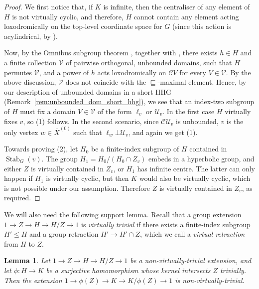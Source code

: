 \documentclass[svgnames]{amsart}
\theoremstyle{plain}
\newtheorem{lemma}[thm]{Lemma}
\theoremstyle{definition}
\newcommand{\C}{\mathcal C}
\newcommand{\ov}[1]{\overline{#1}}
\newcommand{\U}{\mathcal{U}}
\newcommand{\nest}{\sqsubseteq}
\newcommand{\orth}{\bot}
\newcommand{\Stab}[2]{\operatorname{Stab}_{#1}(#2)}
\begin{document}
\begin{proof}
    We first notice that, if $K$ is infinite, then the centraliser of any element of $H$ is not virtually cyclic, and therefore, $H$ cannot contain any element acting loxodromically on the top-level coordinate space for $G$ (since this action is acylindrical, by \cite[Corollary 14.4]{HHS_I}). 

    Now, by the Omnibus subgroup theorem \cite[Theorem 9.20]{DHS}, together with \cite[Theorem 7.1]{DHS}, there exists $h\in H$ and a finite collection $\mathcal V$ of pairwise orthogonal, unbounded domains, such that $H$ permutes $\mathcal V$, and a power of $h$ acts loxodromically on $\C V$ for every $V\in \mathcal V$. By the above discussion, $\mathcal V$ does not coincide with the $\nest$-maximal element. Hence, by our description of unbounded domains in a short HHG (Remark~\ref{rem:unbounded_dom_short_hhg}), we see that an index-two subgroup of $H$ must fix a domain $V\in \mathcal V$ of the form $\ell_v$ or $\U_v$. In the first case $H$ virtually fixes $v$, so (1) follows. In the second scenario, since $\C \U_v$ is unbounded, $v$ is the only vertex $w\in \ov X^{(0)}$ such that $\ell_w\orth \U_v$, and again we get (1).
\par\medskip

    Towards proving (2), let $H_0$ be a finite-index subgroup of $H$ contained in $\Stab{G}{v}$. The group $H_1=H_0/(H_0\cap Z_v)$ embeds in a hyperbolic group, and either $Z$ is virtually contained in $Z_v$, or $H_1$ has infinite centre. The latter can only happen if $H_1$ is virtually cyclic, but then $K$ would also be virtually cyclic, which is not possible under our assumption. Therefore $Z$ is virtually contained in $Z_v$, as required.
\end{proof}


We will also need the following support lemma. Recall that a group extension $1\to Z\to H\to H/Z\to 1$ is \emph{virtually trivial} if there exists a finite-index subgroup $H'\le H$ and a group retraction $H'\to H'\cap Z$, which we call a \emph{virtual retraction} from $H$ to $Z$.


\begin{lemma}
 \label{lem:non_trivial_quot_ext}
 Let $1\to Z\to H\to H/Z\to 1$ be a non-virtually-trivial extension, and let $\phi:H\to K$ be a surjective homomorphism whose kernel intersects $Z$ trivially. Then the extension $1\to \phi(Z)\to K\to K/\phi(Z)\to 1$ is non-virtually-trivial.
\end{lemma}
\end{document}
